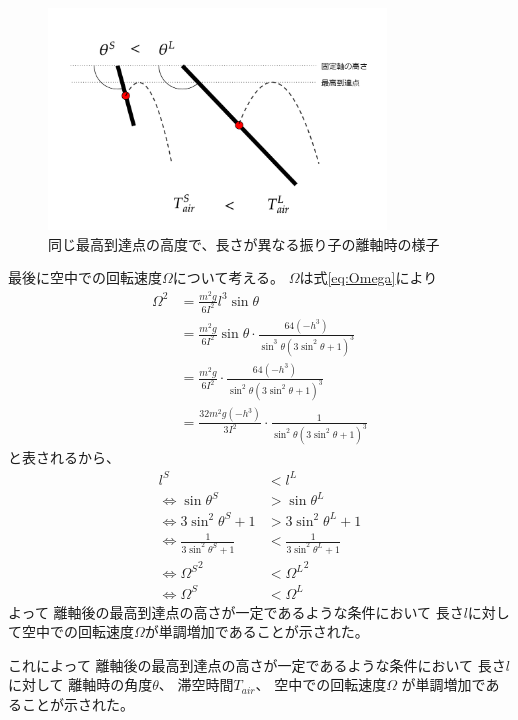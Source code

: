\documentclass[a4paper,11pt]{jsarticle}
\begin{document}
\begin{figure}[h]
  \centering
  \includegraphics[width = 0.8\textwidth]{same_max_height.png}
  \caption{同じ最高到達点の高度で、長さが異なる振り子の離軸時の様子}
  \label{same_max_height.png}
\end{figure}

最後に空中での回転速度$\Omega$について考える。
$\Omega$は式\ref{eq:Omega}により
\begin{align}
  \Omega^2 
  &= \frac{m^2g}{6I^2}l^3\sin\theta
  \\
  &= \frac{m^2g}{6I^2}\sin\theta \cdot \frac{64(-h^3)}{\sin^3\theta(3\sin^2\theta+1)^3}
  \\
  &= \frac{m^2g}{6I^2}\cdot \frac{64(-h^3)}{\sin^2\theta(3\sin^2\theta+1)^3}
  \\
  &= \frac{32m^2g (-h^3)}{3I^2}\cdot \frac{1}{\sin^2\theta(3\sin^2\theta+1)^3}
\end{align}
と表されるから、
\begin{align}
  l^S &< l^L
  \\
  \Leftrightarrow
  \sin\theta^S &> \sin\theta^L
  \\
  \Leftrightarrow
  3\sin^2\theta^S + 1 &> 3\sin^2\theta^L + 1
  \\
  \Leftrightarrow
  \frac{1}{3\sin^2\theta^S + 1} &< \frac{1}{3\sin^2\theta^L + 1}
  \\
  \Leftrightarrow
  {\Omega^S}^2 &< {\Omega^L}^2
  \\
  \Leftrightarrow
  \Omega^S &< \Omega^L
\end{align}
よって
離軸後の最高到達点の高さが一定であるような条件において
長さ$l$に対して空中での回転速度$\Omega$が単調増加であることが示された。

これによって
離軸後の最高到達点の高さが一定であるような条件において
長さ$l$に対して
離軸時の角度$\theta$、
滞空時間$T_{air}$、
空中での回転速度$\Omega$
が単調増加であることが示された。
\end{document}
